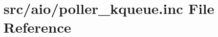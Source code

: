 \hypertarget{poller__kqueue_8inc}{}\section{src/aio/poller\+\_\+kqueue.inc File Reference}
\label{poller__kqueue_8inc}
